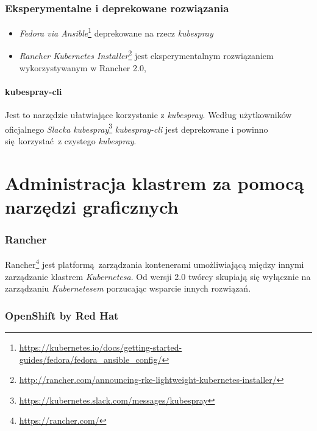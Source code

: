 \documentclass[a4paper,12pt,twoside,openany]{report}
\providecommand{\tightlist}{%
  \setlength{\itemsep}{0pt}\setlength{\parskip}{0pt}}
\DeclareRobustCommand{\href}[2]{#2\footnote{\url{#1}}}
\begin{document}
\hypertarget{eksperymentalne-i-deprekowane-rozwiux105zania}{%
\subsubsection{Eksperymentalne i deprekowane
rozwiązania}\label{eksperymentalne-i-deprekowane-rozwiux105zania}}

\begin{itemize}
\tightlist
\item
  \href{https://kubernetes.io/docs/getting-started-guides/fedora/fedora_ansible_config/}{\emph{Fedora
  via Ansible}} deprekowane na rzecz \emph{kubespray}
\item
  \href{http://rancher.com/announcing-rke-lightweight-kubernetes-installer/}{\emph{Rancher
  Kubernetes Installer}} jest eksperymentalnym rozwiązaniem
  wykorzystywanym w Rancher 2.0,
\end{itemize}

\hypertarget{kubespray-cli}{%
\paragraph{kubespray-cli}\label{kubespray-cli}}

Jest to narzędzie ułatwiające korzystanie z \emph{kubespray}. Według
użytkowników
\href{https://kubernetes.slack.com/messages/kubespray}{oficjalnego
\emph{Slacka} \emph{kubespray}} \emph{kubespray-cli} jest deprekowane i
powinno się~korzystać~z czystego \emph{kubespray}.

\hypertarget{administracja-klastrem-za-pomocux105-narzux119dzi-graficznych}{%
\section{Administracja klastrem za pomocą narzędzi
graficznych}\label{administracja-klastrem-za-pomocux105-narzux119dzi-graficznych}}

\hypertarget{rancher}{%
\subsubsection{Rancher}\label{rancher}}

\href{https://rancher.com/}{Rancher} jest platformą~zarządzania
kontenerami umożliwiającą między innymi zarządzanie klastrem
\emph{Kubernetesa}. Od wersji 2.0 twórcy skupiają się wyłącznie na
zarządzaniu \emph{Kubernetesem} porzucając wsparcie innych rozwiązań.

\hypertarget{openshift-origin}{%
\subsubsection{OpenShift by Red Hat}\label{openshift-origin}}
\end{document}
